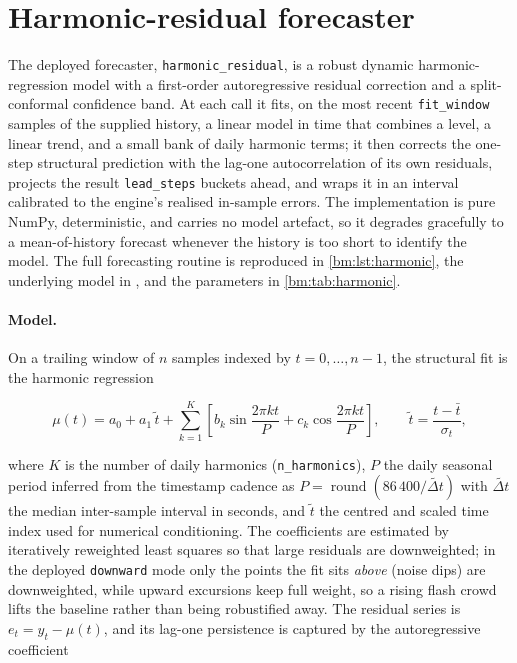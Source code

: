 \section{Harmonic-residual forecaster}\label{bm:alg:harmonic}

The deployed forecaster, \texttt{harmonic\_residual}, is a robust dynamic
harmonic-regression model with a first-order autoregressive residual correction
and a split-conformal confidence band. At each call it fits, on the most recent
\texttt{fit\_window} samples of the supplied history, a linear model in time that
combines a level, a linear trend, and a small bank of daily harmonic terms; it
then corrects the one-step structural prediction with the lag-one autocorrelation
of its own residuals, projects the result \texttt{lead\_steps} buckets ahead, and
wraps it in an interval calibrated to the engine's realised in-sample errors. The
implementation is pure NumPy, deterministic, and carries no model artefact, so it
degrades gracefully to a mean-of-history forecast whenever the history is too
short to identify the model. The full forecasting routine is reproduced in
\cref{bm:lst:harmonic}, the underlying model in
, and the parameters in
\cref{bm:tab:harmonic}.

\paragraph{Model.}
On a trailing window of $n$ samples indexed by $t = 0,\dots,n-1$, the structural
fit is the harmonic regression

\begin{equation}\label{bm:eq:harmonic}
  \mu(t) = a_0 + a_1\,\tilde{t}
  + \sum_{k=1}^{K}\!\left[ b_k \sin\!\frac{2\pi k t}{P}
  + c_k \cos\!\frac{2\pi k t}{P} \right],
  \qquad \tilde{t} = \frac{t - \bar{t}}{\sigma_t},
\end{equation}

where $K$ is the number of daily harmonics (\texttt{n\_harmonics}), $P$ the daily
seasonal period inferred from the timestamp cadence as $P=\operatorname{round}(86\,400 / \widetilde{\Delta t})$
with $\widetilde{\Delta t}$ the median inter-sample interval in seconds, and
$\tilde{t}$ the centred and scaled time index used for numerical conditioning.
The coefficients are estimated by iteratively reweighted least squares so that
large residuals are downweighted; in the deployed \texttt{downward} mode only the
points the fit sits \emph{above} (noise dips) are downweighted, while upward
excursions keep full weight, so a rising flash crowd lifts the baseline rather
than being robustified away. The residual series is $e_t = y_t - \mu(t)$, and its
lag-one persistence is captured by the autoregressive coefficient

